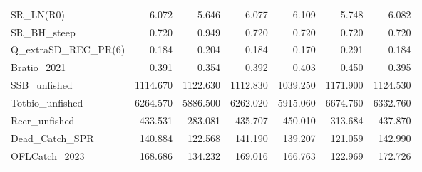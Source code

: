 \documentclass[
  english,
  a4paper,
]{article}
\begin{document}
\begin{table}
{\begin{tabular}[t]{lrrrrrr}
SR\_LN(R0) & 6.072 & 5.646 & 6.077 & 6.109 & 5.748 & 6.082\\
SR\_BH\_steep & 0.720 & 0.949 & 0.720 & 0.720 & 0.720 & 0.720\\
Q\_extraSD\_REC\_PR(6) & 0.184 & 0.204 & 0.184 & 0.170 & 0.291 & 0.184\\
Bratio\_2021 & 0.391 & 0.354 & 0.392 & 0.403 & 0.450 & 0.395\\
SSB\_unfished & 1114.670 & 1122.630 & 1112.830 & 1039.250 & 1171.900 & 1124.530\\
Totbio\_unfished & 6264.570 & 5886.500 & 6262.020 & 5915.060 & 6674.760 & 6332.760\\
Recr\_unfished & 433.531 & 283.081 & 435.707 & 450.010 & 313.684 & 437.870\\
Dead\_Catch\_SPR & 140.884 & 122.568 & 141.190 & 139.207 & 121.059 & 142.990\\
OFLCatch\_2023 & 168.686 & 134.232 & 169.016 & 166.763 & 122.969 & 172.726\\
\bottomrule
\end{tabular}}
\end{table}
\end{document}

